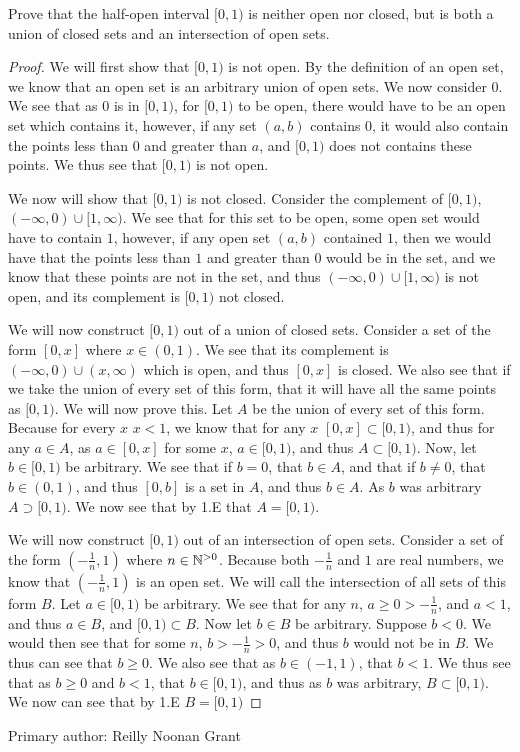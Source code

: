 \begin{minorEx} %
  Prove that the half-open interval $[0,1)$  is neither open nor
  closed, but is both a union of closed sets and an intersection of
  open sets.
\end{minorEx}
\begin{proof}
  We will first show that $[0,1)$ is not open. By the definition of an
  open set, we know that an open set is an arbitrary union of open
  sets. We now consider $0$. We see
  that as $0$ is in $[0,1)$, for $[0,1)$ to be open, there would have
  to be an open set which contains it, however, if any set $(a,b)$
  contains $0$, it would also contain the points less than $0$ and
  greater than $a$, and $[0,1)$ does not contains these points. We
  thus see that $[0,1)$ is not open. 
  
  We now will show that $[0,1)$ is
  not closed. Consider the complement of
  $[0,1)$, $(-\infty,0)\cup [1,\infty)$. We see that for this set to
  be open, some open set would have to contain $1$, however, if any
  open set $(a,b)$ contained $1$, then we would have that the points
  less than $1$ and greater than $0$ would be in the set, and we know
  that these points are not in the set, and thus $(-\infty,0)\cup
  [1,\infty)$ is not open, and its complement is $[0,1)$ not closed.

  We will now construct $[0,1)$ out of a union of closed
  sets. Consider a set of the form $[0,x]$ where $x\in (0,1)$. We see
  that its complement is $(-\infty,0) \cup (x,\infty)$ which is open,
  and thus $[0,x]$ is closed. We also see that if we take the union of
  every set of this form, that it will have all the same points as
  $[0,1)$. We will now prove this. Let $A$ be the union of every set of
  this form. Because for every $x$ $x<1$, we know that for any $x$ 
  $[0,x] \subset [0,1)$, and thus for any $a \in A$, as $a\in [0,x]$
  for some $x$, $a\in [0,1)$, and thus $A\subset [0,1)$. Now, let 
  $b \in [0,1)$ be arbitrary. We see that if $b=0$, that $b\in A$, and
  that if $b\neq 0$, that $b\in (0,1)$, and thus $[0,b]$ is a set in
  $A$, and thus $b\in A$. As $b$ was arbitrary $A\supset [0,1)$. We
  now see that by 1.E that $A = [0,1)$.

  We will now construct $[0,1)$ out of an intersection of open
  sets. Consider a set of the form $(-\frac{1}{n}, 1)$ where $n\in
  \mathbb{N}^{>0}$. Because both $-\frac{1}{n}$ and $1$ are real numbers, we know
  that $(-\frac{1}{n}, 1)$ is an open set. We will call the
  intersection of all sets of this form $B$. Let $a \in [0,1)$ be
  arbitrary. We see that for any $n$, $a\geq 0> -\frac{1}{n}$, and
  $a<1$, and thus $a\in B$, and $[0,1)\subset B$. Now let $b\in B$ be
  arbitrary. Suppose $b <0$. We would then see that for some $n$, 
  $b>-\frac{1}{n}>0$, and thus $b$ would not be in $B$. We thus can
  see that $b\geq 0$. We also see that as $b\in (-1,1)$, that $b<1$.
  We thus see that as $b\geq 0$ and $b<1$, that $b \in [0,1)$, and
  thus as $b$ was arbitrary, $B\subset [0,1)$. We now can see that by
  1.E $B=[0,1)$
\end{proof}

Primary author: Reilly Noonan Grant

\begin{minorEx} %
\end{minorEx}
